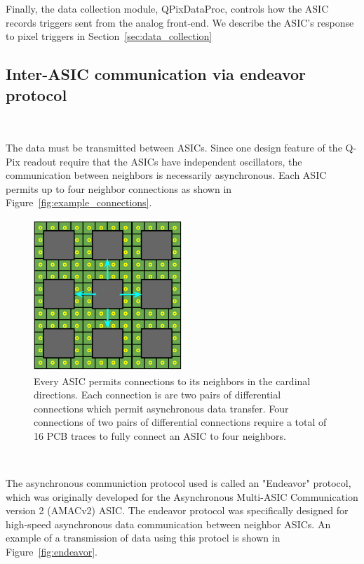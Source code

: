 Finally, the data collection module, QPixDataProc, controls how the ASIC records triggers sent from the analog front-end.
We describe the ASIC's response to pixel triggers in Section~\ref{sec:data_collection}


\subsection{Inter-ASIC communication via endeavor protocol}~\label{sec:endeavor}

The data must be transmitted between ASICs.
Since one design feature of the Q-Pix readout require that the ASICs have independent oscillators, the communication between neighbors is necessarily asynchronous.
Each ASIC permits up to four neighbor connections as shown in Figure~\ref{fig:example_connections}.

\begin{figure}[]
\centering
\includegraphics[width=0.5\textwidth]{images/asic_neighbor_connections_qpix.png}
\caption{Every ASIC permits connections to its neighbors in the cardinal directions.
Each connection is are two pairs of differential connections which permit asynchronous data transfer.
Four connections of two pairs of differential connections require a total of 16 PCB traces to fully connect an ASIC to four neighbors.
}
\end{figure}~\label{fig:example_connections}

The asynchronous communiction protocol used is called an "Endeavor" protocol, which was originally developed for the Asynchronous Multi-ASIC Communication version 2 (AMACv2) ASIC.
The endeavor protocol was specifically designed for high-speed asynchronous data communication between neighbor ASICs.
An example of a transmission of data using this protocl is shown in Figure~\ref{fig:endeavor}.

